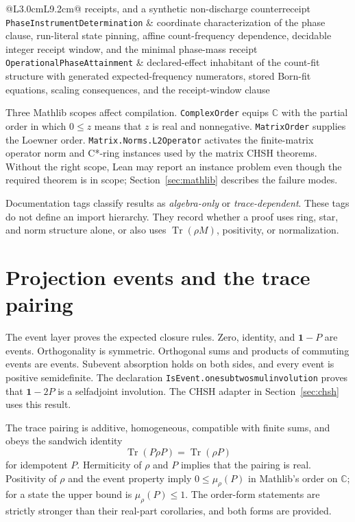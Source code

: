 \documentclass[11pt]{article}
\renewcommand{\_}{\textunderscore\allowbreak}
\theoremstyle{remark}
\newcommand{\C}{\mathbb C}
\newcommand{\Tr}{\operatorname{Tr}}
\newcommand{\one}{\mathbf 1}
\begin{document}
\begin{table}[ht]
\begin{tabular}{@{}L{3.0cm}L{9.2cm}@{}}
receipts, and a synthetic non-discharge counterreceipt \\
\texttt{Phase\allowbreak Instrument\allowbreak Determination} & coordinate
characterization of the phase clause, run-literal state pinning, affine
count-frequency dependence, decidable integer receipt window, and the
minimal phase-mass receipt \\
\texttt{Operational\allowbreak Phase\allowbreak Attainment} &
declared-effect inhabitant of the count-fit structure with generated
expected-frequency numerators, stored Born-fit equations, scaling consequences,
and the receipt-window clause \\
\bottomrule
\end{tabular}
\caption{Module structure of the checked development.}
\label{tab:modules}
\end{table}

Three Mathlib scopes affect compilation. \texttt{ComplexOrder} equips
$\C$ with the partial order in which $0\le z$ means that $z$ is real and
nonnegative. \texttt{MatrixOrder} supplies the Loewner order.
\texttt{Matrix.Norms.L2Operator} activates the finite-matrix operator norm and
C*-ring instances used by the matrix CHSH theorems. Without the right scope,
Lean may report an instance problem even though the required theorem is in
scope; Section~\ref{sec:mathlib} describes the failure modes.

Documentation tags classify results as \emph{algebra-only} or
\emph{trace-dependent}. These tags do not define an import hierarchy. They
record whether a proof uses ring, star, and norm structure alone, or also uses
$\Tr(\rho M)$, positivity, or normalization.

\section{Projection events and the trace pairing}
\label{sec:events}

The event layer proves the expected closure rules. Zero, identity, and
$\one-P$ are events. Orthogonality is symmetric. Orthogonal sums and products
of commuting events are events. Subevent absorption holds on both sides, and
every event is positive semidefinite. The declaration
\texttt{IsEvent.one\_sub\_two\_smul\_involution} proves that
$\one-2P$ is a selfadjoint involution. The CHSH adapter in
Section~\ref{sec:chsh} uses this result.

The trace pairing is additive, homogeneous, compatible with finite sums, and
obeys the sandwich identity
\[
  \Tr(P\rho P)=\Tr(\rho P)
\]
for idempotent $P$. Hermiticity of $\rho$ and $P$ implies that the pairing is
real. Positivity of $\rho$ and the event property imply
$0\le\mu_\rho(P)$ in Mathlib's order on $\C$; for a state the upper bound is
$\mu_\rho(P)\le 1$. The order-form statements are strictly stronger than
their real-part corollaries, and both forms are provided.
\end{document}
